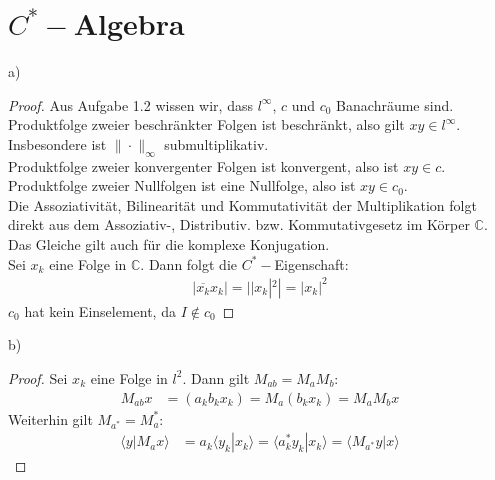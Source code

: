 \documentclass[a4paper,12pt]{article}
\newcommand{\brak}{}
\begin{document}
\section{$C^\ast-$Algebra}
a)
\begin{proof}
Aus Aufgabe 1.2 wissen wir, dass $l^\infty$, $c$ und $c_0$ Banachräume sind. \\
Produktfolge zweier beschränkter Folgen ist beschränkt, also gilt $xy\in l^\infty$. Insbesondere ist $\|\cdot\|_\infty$ submultiplikativ. \\
Produktfolge zweier konvergenter Folgen ist konvergent, also ist $xy\in c$. \\
Produktfolge zweier Nullfolgen ist eine Nullfolge, also ist $xy\in c_0$. \\
Die Assoziativität, Bilinearität und Kommutativität der Multiplikation folgt direkt aus dem Assoziativ-, Distributiv. bzw. Kommutativgesetz im Körper $\mathbb{C}$. Das Gleiche gilt auch für die komplexe Konjugation. \\
Sei $x_k$ eine Folge in $\mathbb{C}$. Dann folgt die $C^\ast-$Eigenschaft:
\begin{align*}
|\overline{x_k}x_k|=||x_k|^2|=|x_k|^2
\end{align*}
$c_0$ hat kein Einselement, da $I\notin c_0 $
\end{proof}
b)
\begin{proof}
Sei $x_k$ eine Folge in $l^2$. Dann gilt $M_{ab}=M_aM_b$:
\begin{align*}
M_{ab}x&=(a_kb_kx_k)=M_a(b_kx_k)=M_aM_bx
\end{align*}
Weiterhin gilt $M_{a^\ast}=M_a^\ast$:
\begin{align*}
\brak\langle {y}| {M_ax}\rangle&=a_k\brak\langle {y_k}| {x_k}\rangle=\brak\langle {a_k^\ast y_k}| {x_k}\rangle=\brak\langle {M_{a^\ast}y}| {x}\rangle
\end{align*}
\end{proof}
\end{document}
